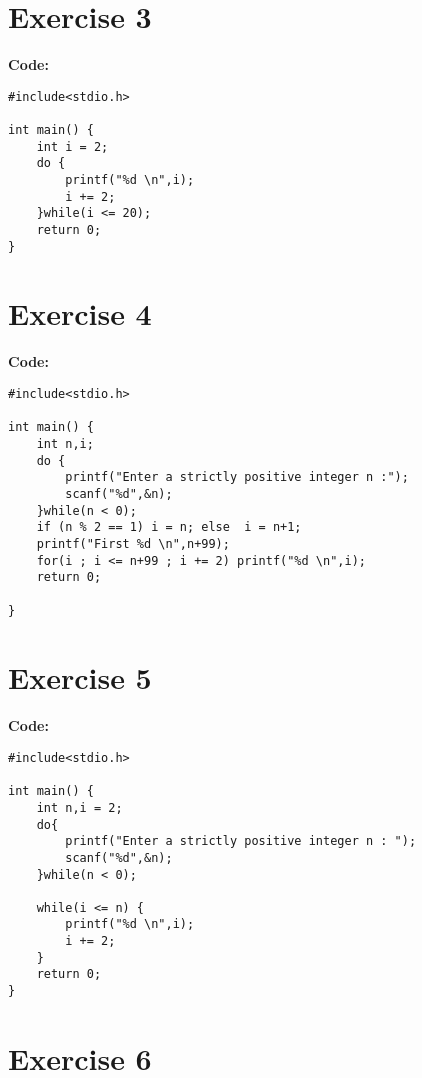 \documentclass[12pt]{article}
\begin{document}
	\section*{Exercise 3}
	\vspace{0.5cm}
	
	\textbf{Code:}
\begin{lstlisting}
#include<stdio.h> 

int main() {
    int i = 2;
    do {
        printf("%d \n",i);
        i += 2;
    }while(i <= 20);
    return 0;
}
\end{lstlisting}
	\vspace{1cm}
	
	\section*{Exercise 4}
	\vspace{0.5cm}
	
	\textbf{Code:}
\begin{lstlisting}
#include<stdio.h>

int main() {
    int n,i;
    do {
        printf("Enter a strictly positive integer n :");
        scanf("%d",&n);
    }while(n < 0);
    if (n % 2 == 1) i = n; else  i = n+1;
    printf("First %d \n",n+99);
    for(i ; i <= n+99 ; i += 2) printf("%d \n",i);
    return 0;

}
\end{lstlisting}
	\vspace{1cm}
	
	\section*{Exercise 5}
	\vspace{0.5cm}
	
	\textbf{Code:}
\begin{lstlisting}
#include<stdio.h>

int main() {
    int n,i = 2;
    do{
        printf("Enter a strictly positive integer n : ");
        scanf("%d",&n);
    }while(n < 0);
    
    while(i <= n) {
        printf("%d \n",i);
        i += 2;
    }
    return 0;
}
\end{lstlisting}
	\vspace{1cm}
\newpage
	\section*{Exercise 6}
	\vspace{0.5cm}
	
\end{document}
